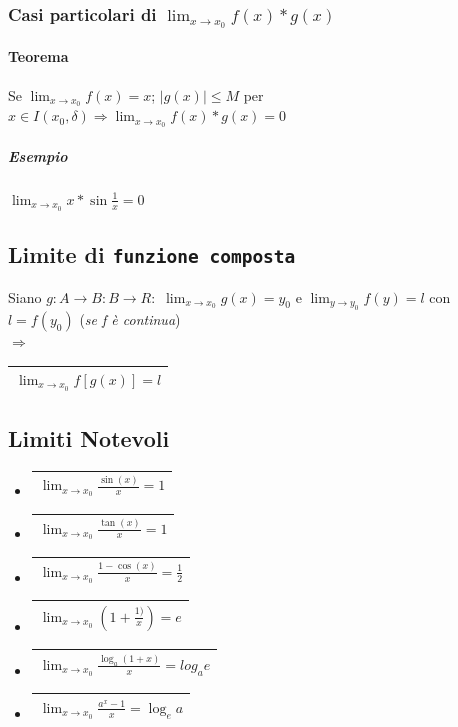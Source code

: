 \subsubsection{Casi particolari di $\lim_{x\to x_0} f(x)*g(x)$}
\paragraph{Teorema}
Se $\lim_{x\to x_0} f(x)=x$; $|g(x)|\leq M$ per $x\in I(x_0,\delta)\Rightarrow
\lim_{x\to x_0}f(x)*g(x)=0$
\subparagraph{Esempio} $\lim_{x\to x_0}x*\sin\frac{1}{x}=0$
\subsection{Limite di \texttt{funzione composta}}
Siano $g:A\to B:B\to R:$ $\lim_{x\to x_0}g(x)=y_0$ e $\lim_{y\to y_0}f(y)=l$
con $l=f(y_0)$ (\textit{se f è continua})\\
$\Rightarrow$\begin{tabular}{|l|}
	\hline$\lim_{x\to x_0}f[g(x)]=l$\\\hline
\end{tabular}
\subsection{Limiti Notevoli}
\begin{multicols}{2}
	\begin{itemize}
		\item \begin{tabular}{|l|}
				\hline
				$\lim_{x\to x_0}\frac{\sin (x)}{x}=1$\\\hline
		\end{tabular}
		\item \begin{tabular}{|l|}
				\hline
				$\lim_{x\to x_0}\frac{\tan (x)}{x}=1$\\\hline
		\end{tabular}
		\item \begin{tabular}{|l|}
				\hline
				$\lim_{x\to x_0}\frac{1-\cos (x)}{x}=\frac{1}{2}$\\\hline
		\end{tabular}
		\item \begin{tabular}{|l|}
				\hline
				$\lim_{x\to x_0}(1+\frac{1)}{x})=e$\\\hline
		\end{tabular}
		\item \begin{tabular}{|l|}
				\hline
				$\lim_{x\to x_0}\frac{\log_a (1+x)}{x}=log_ae$\\\hline
		\end{tabular}
		\item \begin{tabular}{|l|}
				\hline
				$\lim_{x\to x_0}\frac{a^x-1}{x}=\log_ea$\\\hline
		\end{tabular}
	\end{itemize}
\end{multicols}
